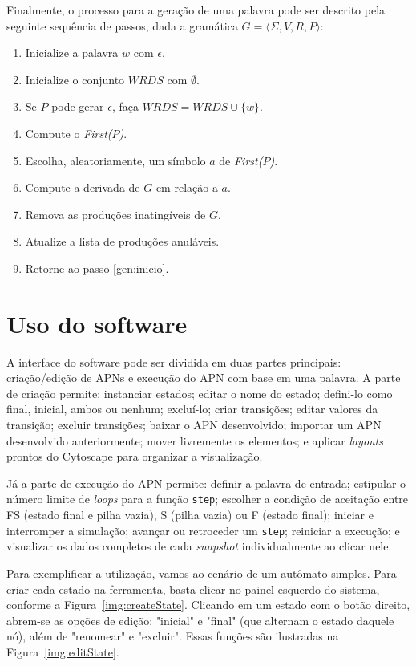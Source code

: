 Finalmente, o processo para a geração de uma palavra pode ser descrito pela seguinte sequência de passos, dada a gramática $G = \langle \Sigma, V, R, P\rangle$:

  \begin{enumerate}
     \item Inicialize a palavra $w$ com $\epsilon$.
     \item Inicialize o conjunto $WRDS$ com $\emptyset$.
     \item \label{gen:inicio} Se $P$ pode gerar $\epsilon$, faça $WRDS = WRDS \cup \{w\}$.
     \item Compute o \emph{First($P$)}.
     \item Escolha, aleatoriamente, um símbolo $a$ de \emph{First($P$)}.
     \item Compute a derivada de $G$ em relação a $a$.
     \item Remova as produções inatingíveis de $G$.
     \item Atualize a lista de produções anuláveis.
     \item Retorne ao passo \ref{gen:inicio}.
  \end{enumerate}

\section{Uso do software}\label{sec:uso}

A interface do software pode ser dividida em duas partes principais: criação/edição de APNs e execução do APN com base em uma palavra. A parte de criação permite: instanciar estados; editar o nome do estado; defini-lo como final, inicial, ambos ou nenhum; excluí-lo; criar transições; editar valores da transição; excluir transições; baixar o APN desenvolvido; importar um APN desenvolvido anteriormente; mover livremente os elementos; e aplicar \emph{layouts} prontos do Cytoscape para organizar a visualização.

Já a parte de execução do APN permite: definir a palavra de entrada; estipular o número limite de \emph{loops} para a função \texttt{step}; escolher a condição de aceitação entre FS (estado final e pilha vazia), S (pilha vazia) ou F (estado final); iniciar e interromper a simulação; avançar ou retroceder um \texttt{step}; reiniciar a execução; e visualizar os dados completos de cada \emph{snapshot} individualmente ao clicar nele.

Para exemplificar a utilização, vamos ao cenário de um autômato simples. Para criar cada estado na ferramenta, basta clicar no painel esquerdo do sistema, conforme a Figura~\ref{img:createState}. Clicando em um estado com o botão direito, abrem-se as opções de edição: "inicial" e "final" (que alternam o estado daquele nó), além de "renomear" e "excluir". Essas funções são ilustradas na Figura~\ref{img:editState}.

